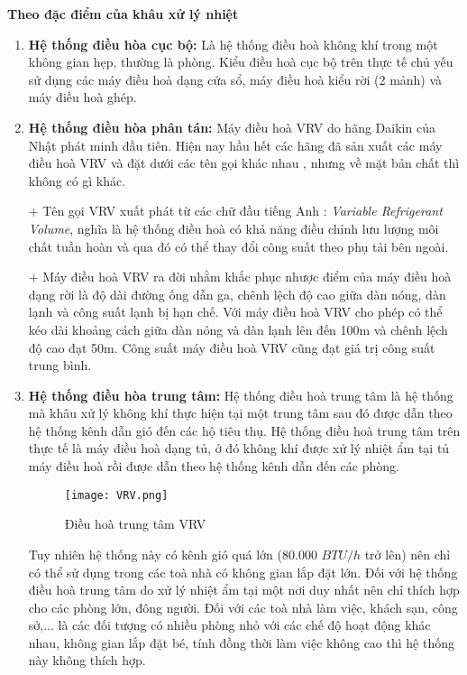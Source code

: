 	\textbf{Theo đặc điểm của khâu xử lý nhiệt}
	\begin{enumerate}
		\setlength\itemsep{1mm}
		\item \textbf{Hệ thống điều hòa cục bộ:} Là hệ thống điều hoà không khí trong một không gian hẹp, thường là phòng. Kiểu điều hoà cục bộ trên thực tế chủ yếu sử dụng các máy điều hoà dạng cửa sổ, máy điều hoà kiểu rời (2 mảnh) và máy điều hoà ghép.
		\item \textbf{Hệ thống điều hòa phân tán:} Máy điều hoà VRV do hãng Daikin của Nhật phát minh đầu tiên. Hiện nay hầu hết các hãng đã sản xuất các máy điều hoà VRV và đặt dưới các tên gọi khác nhau , nhưng về mặt bản chất thì không có gì khác.
		
	+ Tên gọi VRV xuất phát từ các chữ đầu tiếng Anh : \textit{Variable Refrigerant Volume}, nghĩa là hệ thống điều hoà có khả năng điều chỉnh lưu lượng môi chất tuần hoàn và qua đó có thể thay đổi công suất theo phụ tải bên ngoài.

	+ Máy điều hoà VRV ra đời nhằm khắc phục nhược điểm của máy điều hoà dạng rời là độ dài đường ống dẫn ga, chênh lệch độ cao giữa dàn nóng, dàn lạnh và công suất lạnh bị hạn chế. Với máy điều hoà VRV cho phép có thể kéo dài khoảng cách giữa dàn nóng và dàn lạnh lên đến 100m và chênh lệch độ cao đạt 50m. Công suất máy điều hoà VRV cũng đạt giá trị công suất trung bình.
	
		\item \textbf{Hệ thống điều hòa trung tâm:} Hệ thống điều hoà trung tâm là hệ thống mà khâu xử lý không khí thực hiện tại một trung tâm sau đó được dẫn theo hệ thống kênh dẫn gió đến các hộ tiêu thụ. Hệ thống điều hoà trung tâm trên thực tế là máy điều hoà dạng tủ, ở đó không khí được xử lý nhiệt ẩm tại tủ máy điều hoà rồi được dẫn theo hệ thống kênh dẫn đến các phòng.
		
		\begin{figure}[H]
			\centering
			\texttt{[image: VRV.png]}
			\caption{Điều hoà trung tâm VRV}
		\end{figure}

	Tuy nhiên hệ thống này có kênh gió quá lớn (80.000 $BTU/h$ trở lên) nên chỉ có thể sử dụng trong các toà nhà có không gian lắp đặt lớn. Đối với hệ thống điều hoà trung tâm do xử lý nhiệt ẩm tại một nơi duy nhất nên chỉ thích hợp cho các phòng lớn, đông người. Đối với các toà nhà làm việc, khách sạn, công sở,... là các đối tượng có nhiều phòng nhỏ với các chế độ hoạt động khác nhau, không gian lắp đặt bé, tính đồng thời làm việc không cao thì hệ thống này không thích hợp.
	\end{enumerate}
	

